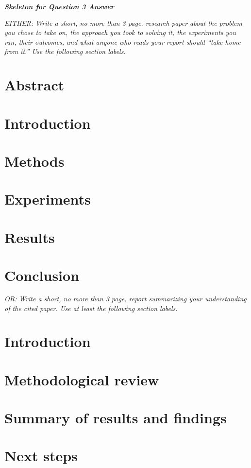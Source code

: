 \documentclass{article}
\begin{document}
{\em \bf Skeleton for Question 3 Answer}
\setcounter{section}{0}

\emph{EITHER: Write a short, no more than 3 page, research paper about the problem you chose
to take on, the approach you took to solving it, the experiments you ran,
their outcomes, and what anyone who reads your report should ``take home from it.''  Use the following section labels.}

\section{Abstract}
\section{Introduction}
\section{Methods}
\section{Experiments}
\section{Results}
\section{Conclusion}

\emph{OR: Write a short, no more than 3 page, report summarizing your understanding of the cited paper.  Use at least the following section labels.}
\setcounter{section}{0}

\section{Introduction}
\section{Methodological review} 
\section{Summary of results and findings}
\section{Next steps}
\end{document}
